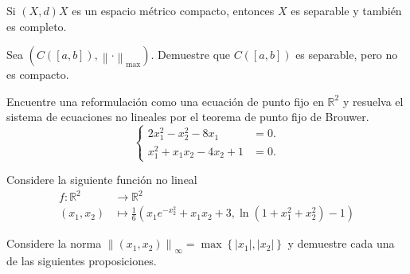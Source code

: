   \begin{solutionordottedlines}
  \end{solutionordottedlines}

  \question

  Si $\left(X,d\right)X$ es un espacio métrico compacto, entonces $X$
  es separable y también es completo.

  \begin{solutionordottedlines}
  \end{solutionordottedlines}

  \question

  Sea
  \begin{math}
    \left(
      C\left(\left[a,b\right]\right),
      \left\|\cdot\right\|_{\max}
    \right)
  \end{math}.
  Demuestre que $C\left(\left[a,b\right]\right)$ es separable, pero
  no es compacto.

  \begin{solutionordottedlines}
  \end{solutionordottedlines}

  \question

  Encuentre una reformulación como una ecuación de punto fijo en
  $\mathbb{R}^{2}$ y resuelva el sistema de ecuaciones no lineales
  por el teorema de punto fijo de Brouwer.
  \begin{equation*}
    \left\{
      \begin{aligned}
        2x^{2}_{1}-x^{2}_{2}-8x_{1}&=0.\\
        x^{2}_{1}+x_{1}x_{2}-4x_{2}+1&=0.
      \end{aligned}
      \right.
    \end{equation*}

    \begin{solutionordottedlines}
    \end{solutionordottedlines}

    \question

    Considere la siguiente función no lineal
    \begin{align*}
      f\colon\mathbb{R}^{2}&\longrightarrow\mathbb{R}^{2}\\
      \left(x_{1},x_{2}\right)&\longmapsto
      \frac{1}{6}
      \left(
        x_{1}e^{-x^{2}_{2}}+x_{1}x_{2}+3,
        \ln\left(1+x_{1}^{2}+
        x^{2}_{2}\right)-1
      \right)
    \end{align*}

    Considere la norma
    \begin{math}
      {\left\|\left(x_{1},x_{2}\right)\right\|}_{\infty}=
      \max\left\{\left|x_{1}\right|,\left|x_{2}\right|\right\}
    \end{math}
    y demuestre cada una de las siguientes proposiciones.

